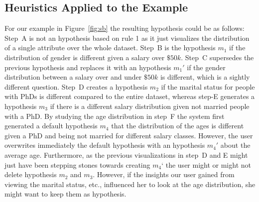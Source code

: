 \subsection{Heuristics Applied to the Example}
For our example in Figure~\ref{fig:sb} the resulting hypothesis could be as follows:
Step~A is not an hypothesis based on rule 1 as it just visualizes the distribution of a single attribute over the whole dataset. 
Step~B is the hypothesis $m_1$ if the distribution of gender is different given a salary over $\$50k$. 
Step~C supersedes the previous hypothesis and replaces it with an hypothesis $m_1'$ if the gender distribution between a salary over and under $\$50k$ is different, which is a sightly different question. 
Step~D creates a hypothesis $m_2$ if the marital status for people with PhDs is different compared to the entire dataset, whereas step-E generates a hypothesis $m_3$ if there is a different salary distribution given not married people with a PhD. 
By studying the age distribution in step~F the system first generated a default hypothesis $m_4$  that the distribution of the ages is different given a PhD and being not married for different salary classes. 
However, the user overwrites immediately the default hypothesis with an hypothesis $m_4'$  about the average age. 
Furthermore, as the previous visualizations in step~D and E might just have been stepping stones towards creating $m_4‘$ the user might or might not delete hypothesis $m_2$ and $m_3$. 
However, if the insights our user gained from viewing the marital status, etc., influenced her to look at the age distribution, she might want to keep them as hypothesis. 

